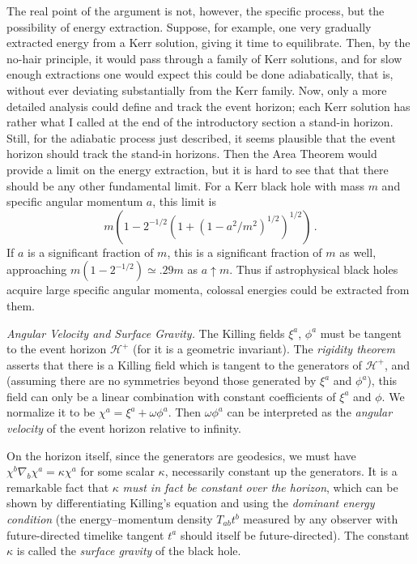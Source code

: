 \documentclass[12pt]{article}
\newcommand{\Hf}{{{\mathscr H}^{+}}} %
\begin{document}
The real point of the argument is not, however, the specific process, but the possibility of energy extraction.  Suppose, for example, one very gradually extracted energy from a Kerr solution, giving it time to equilibrate.  Then, by the no-hair principle, it would pass through a family of Kerr solutions, and 
for slow enough extractions one would expect this could be done adiabatically, that is, without ever deviating substantially from the Kerr family.  Now, only a more detailed analysis could define and track the event horizon; each Kerr solution has rather what I called at the end of the introductory section a stand-in horizon. 
Still, for the adiabatic process just described, it seems plausible that the event horizon should track the stand-in horizons.  Then the Area Theorem would provide a limit on the energy extraction, but it is hard to see that that there should be any other fundamental limit.  For a Kerr black hole with mass $m$ and specific angular momentum $a$, this limit is
\begin{equation}
  m(1-2^{-1/2}(1+(1-a^2/m^2)^{1/2})^{1/2})\, .
\end{equation}
If $a$ is a significant fraction of $m$, this is a significant fraction of $m$ as well, approaching $m(1-2^{-1/2})\simeq .29 m$ as $a\uparrow m$.  Thus if astrophysical black holes acquire large specific angular momenta, colossal energies could be extracted from them.


{\em Angular Velocity and Surface Gravity.}
The Killing fields $\xi ^a$, $\phi ^a$ must be tangent to the event horizon $\Hf$ (for it is a geometric invariant).  The {\em rigidity theorem}~\citep{Hawking:1971vc,Hawking:1973uf} asserts that there is a Killing field which is tangent to the generators of $\Hf$, and
(assuming there are no symmetries beyond those generated by $\xi ^a$ and $\phi ^a$), this field can only be a linear combination with constant coefficients of $\xi ^a$ and $\phi$.  We normalize it to be $\chi ^a=\xi ^a+\omega\phi ^a$.
Then $\omega \phi ^a$ can be interpreted as the {\em angular velocity} of the event horizon relative to infinity.  

On the horizon itself, since the generators are geodesics, we must have $\chi ^b\nabla _b\chi ^a=\kappa \chi ^a$ for some scalar $\kappa$, necessarily constant up the generators.  It is a remarkable fact that $\kappa$ {\em must in fact be constant over the horizon}, which can be shown by differentiating Killing's equation and using the {\em dominant energy condition} (the energy--momentum density $T_{ab}t^b$ measured by any observer with future-directed timelike tangent $t^a$ should itself be future-directed).
The constant $\kappa$ is called the {\em surface gravity} of the black hole.
\end{document}
